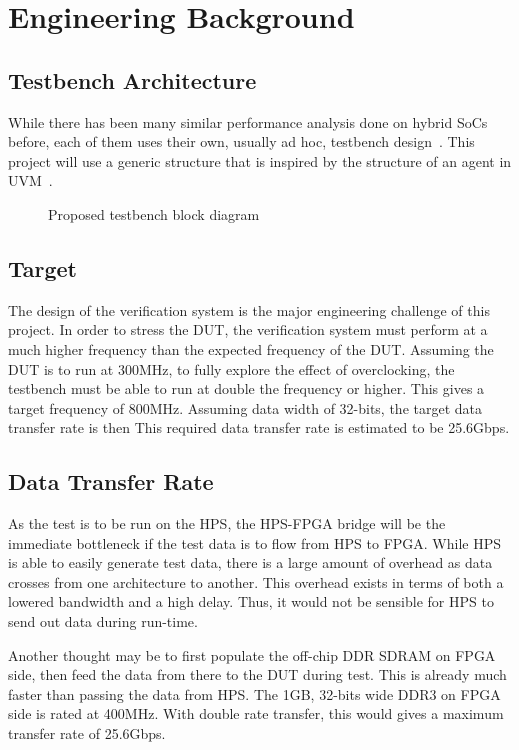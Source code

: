 \section{Engineering Background}

\subsection{Testbench Architecture}

While there has been many similar performance analysis done on hybrid SoCs
before, each of them uses their own, usually ad hoc, testbench
design~\cite{Shi1}.
This project will use a generic structure that is inspired by the structure of
an agent in UVM~\cite{Accellera1}.

\begin{figure}[H]
  \centering
  
  \caption{Proposed testbench block diagram}
  \label{Block}
\end{figure}

\subsection{Target}
The design of the verification system is the major engineering challenge of this
project.
In order to stress the DUT, the verification system must perform at a much
higher frequency than the expected frequency of the DUT.
Assuming the DUT is to run at 300MHz, to fully explore the effect of
overclocking, the testbench must be able to run at double the frequency or
higher.
This gives a target frequency of 800MHz.
Assuming data width of 32-bits, the target data transfer rate is then 
This required data transfer rate is estimated to be 25.6Gbps.

\subsection{Data Transfer Rate}
As the test is to be run on the HPS, the HPS-FPGA bridge will be the
immediate bottleneck if the test data is to flow from HPS to FPGA.
While HPS is able to easily generate test data,
there is a large amount of overhead as data crosses from one architecture
to another.
This overhead exists in terms of both a lowered bandwidth and a high delay.
Thus, it would not be sensible for HPS to send out data during run-time.

Another thought may be to first populate the off-chip DDR SDRAM on FPGA
side, then feed the data from there to the DUT during test.
This is already much faster than passing the data from HPS.
The 1GB, 32-bits wide DDR3 on FPGA side is rated at 400MHz.
With double rate transfer, this would gives a maximum transfer rate of 25.6Gbps.

